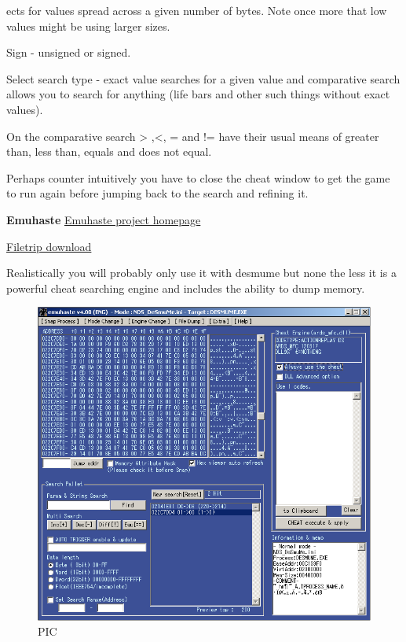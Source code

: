 \documentclass[
]{book}
\begin{document}
ects for values spread across a given number of bytes. Note once more that low values might be using larger sizes.

Sign - unsigned or signed.

Select search type - exact value searches for a given value and comparative search allows you to search for anything (life bars and other such things without exact values).

On the comparative search \textgreater{} ,\textless, = and != have their usual means of greater than, less than, equals and does not equal.

Perhaps counter intuitively you have to close the cheat window to get the game to run again before jumping back to the search and refining it.

\textbf{Emuhaste} \href{http://i486.client.jp/emuhaste/}{Emuhaste project homepage}

\href{http://filetrip.net/nds-downloads/utilities/latest-emucr-emuhaste-f29424.html}{Filetrip download}

Realistically you will probably only use it with desmume but none the less it is a powerful cheat searching engine and includes the ability to dump memory.

\begin{figure}
\centering
\includegraphics{images/199_home_fast6191_romhackingguide_unrenamed_fil___original_borders_romhackingguidendsemuhaste.png}
\caption{PIC}
\end{figure}
\end{document}
